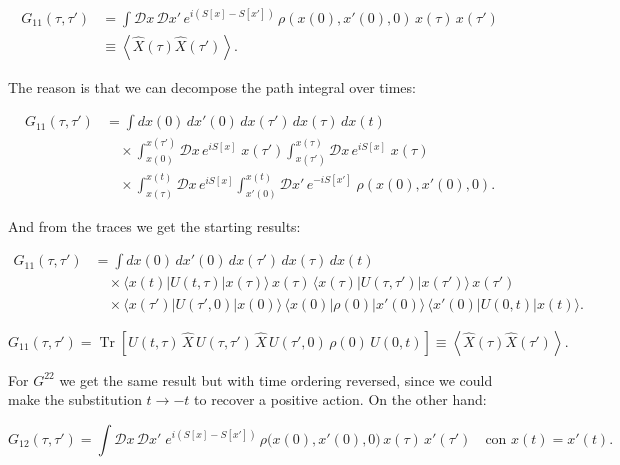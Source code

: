 \documentclass[12pt,a4paper,oneside]{article}
\numberwithin{equation}{section}   %
\begin{document}
\begin{align}
G_{11}(\tau,\tau')
&=
\int \mathcal{D}x\,\mathcal{D}x'\,
e^{i\left(S[x]-S[x']\right)}
\,\rho\!\left(x(0),x'(0),0\right)\,
x(\tau)\,x(\tau')
\nonumber\\
&\equiv
\left\langle
\hat X(\tau)\hat X(\tau')
\right\rangle .
\end{align}

The reason is that we can decompose the path integral over times:

\begin{align}
G_{11}(\tau,\tau')
&=
\int dx(0)\,dx'(0)\,dx(\tau')\,dx(\tau)\,dx(t)
\nonumber\\
&\quad\times
\int_{x(0)}^{x(\tau')}
\mathcal{D}x\,
e^{iS[x]}
\;
x(\tau')
\int_{x(\tau')}^{x(\tau)}
\mathcal{D}x\,
e^{iS[x]}
\;
x(\tau)
\nonumber\\
&\quad\times
\int_{x(\tau)}^{x(t)}
\mathcal{D}x\,
e^{iS[x]}
\int_{x'(0)}^{x(t)}
\mathcal{D}x'\,
e^{-iS[x']}
\;
\rho\!\left(x(0),x'(0),0\right).
\end{align}

And from the traces we get the starting results:

\begin{align}
G_{11}(\tau,\tau')
&=
\int dx(0)\,dx'(0)\,dx(\tau')\,dx(\tau)\,dx(t)
\nonumber\\
&\quad\times
\langle x(t)|U(t,\tau)|x(\tau)\rangle\,
x(\tau)\,
\langle x(\tau)|U(\tau,\tau')|x(\tau')\rangle\,
x(\tau')
\nonumber\\
&\quad\times
\langle x(\tau')|U(\tau',0)|x(0)\rangle\,
\langle x(0)|\rho(0)|x'(0)\rangle\,
\langle x'(0)|U(0,t)|x(t)\rangle.
\end{align}

\begin{equation}
G_{11}(\tau,\tau')
=
\operatorname{Tr}
\!\left[
U(t,\tau)\,
\hat X\,
U(\tau,\tau')\,
\hat X\,
U(\tau',0)\,
\rho(0)\,
U(0,t)
\right]\equiv
\left\langle
\hat X(\tau)\hat X(\tau')
\right\rangle .
\end{equation}

For $G^{22}$ we get the same result but with time ordering reversed, since we 
could make the substitution $t\to -t$ to recover a positive action.
On the other hand:

\begin{equation}
G_{12}(\tau,\tau')
=
\int \mathcal{D}x\,\mathcal{D}x'\;
e^{i(S[x]-S[x'])}\,
\rho\!\big(x(0),x'(0),0\big)\,
x(\tau)\,x'(\tau')
\quad \text{con } x(t)=x'(t).
\end{equation}
\end{document}
